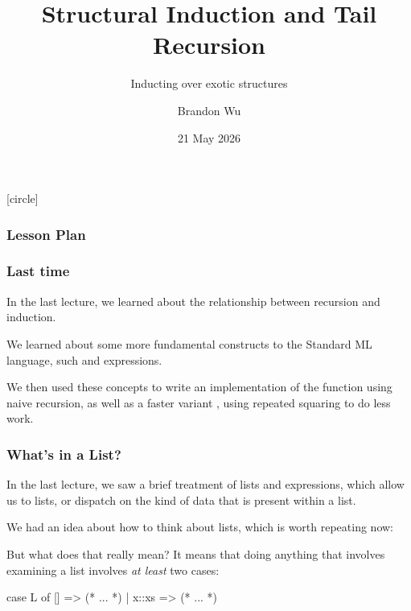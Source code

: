 \documentclass[aspectratio=169]{beamer}
\title{Structural Induction and Tail Recursion} %
\subtitle{Inducting over exotic structures} %
\date{21 May 2026} %
\author{Brandon Wu} %
\newif\ifcolorlambda
\begin{document}
\ifweb
\renewcommand{\pause}{}
\fi

[circle]

{
\begin{frame}[plain]
\colorlambdatrue
\titlepage
\end{frame}
}

\begin{frame}[fragile]
\frametitle{Lesson Plan}

\tableofcontents
\end{frame}

\begin{frame}[fragile]
  \frametitle{Last time}

  In the last lecture, we learned about the relationship between recursion
  and induction.

  \pause
  \vspace{\fill}

  We learned about some more fundamental constructs to the Standard ML language, such
   and  expressions.

  \pause
  \vspace{\fill}

  We then used these concepts to write an implementation of the  function
  using naive recursion, as well as a faster variant , using
  repeated squaring to do less work.
\end{frame}


\begin{frame}[fragile]
  \frametitle{What's in a List?}

  In the last lecture, we saw a brief treatment of lists and 
  expressions, which allow us to  lists, or dispatch
  on the kind of data that is present within a list.

  \pause
  \vspace{\fill}

  We had an idea about how to think about lists, which is worth repeating now:

  \pause
  \vspace{5pt}


  \pause
  \vspace{\fill}

  But what does that really mean? It means that doing anything that involves
  examining a list involves \textit{at least} two cases:

  \begin{codeblock}
    case L of
      [] => (* ... *)
    | x::xs => (* ... *)
  \end{codeblock}
\end{frame}
\end{document}
